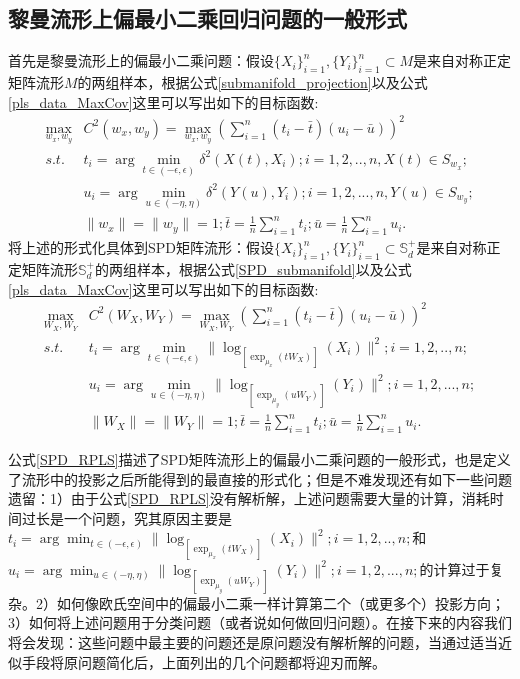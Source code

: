 \subsection{黎曼流形上偏最小二乘回归问题的一般形式}
\label{sec:RPLS_common}
首先是黎曼流形上的偏最小二乘问题：假设$\{X_i\}_{i=1}^{n},\{Y_i\}_{i=1}^{n} \subset M$是来自对称正定矩阵流形$M$的两组样本，根据公式\ref{submanifold_projection}以及公式\ref{pls_data_MaxCov}这里可以写出如下的目标函数:
\begin{equation}
\label{Riemannian_PLS}
\begin{split}
\max_{w_x,w_y}& C^2(w_x,w_y)=\max_{w_x,w_y}{\left(\sum_{i=1}^{n}(t_i-\bar{t})(u_i-\bar{u})\right)^2}\\
s.t.~~&t_i=\arg\min_{t \in (-\epsilon,\epsilon)}\delta^{2}(X(t),X_i);i=1,2,..,n, X(t) \in S_{w_x};\\
&u_i=\arg\min_{u \in (-\eta,\eta)}\delta^{2}(Y(u),Y_i);i=1,2,...,n, Y(u) \in S_{w_y};\\
&\|w_x\|=\|w_y\|=1;\bar{t}=\frac{1}{n}\sum_{i=1}^{n}t_i;\bar{u}=\frac{1}{n}\sum_{i=1}^{n}u_i.
\end{split}
\end{equation}
将上述的形式化具体到SPD矩阵流形：假设$\{X_i\}_{i=1}^{n},\{Y_i\}_{i=1}^{n} \subset \mathbb{S}_{d}^{+}$是来自对称正定矩阵流形$\mathbb{S}_{d}^{+}$的两组样本，根据公式\ref{SPD_submanifold}以及公式\ref{pls_data_MaxCov}这里可以写出如下的目标函数:
\begin{equation}
\label{SPD_RPLS}
\begin{split}
\max_{W_X,W_Y}& C^2(W_X,W_Y)=\max_{W_X,W_Y}{\left(\sum_{i=1}^{n}(t_i-\bar{t})(u_i-\bar{u})\right)^2}\\
s.t.~~&t_i=\arg\min_{t \in (-\epsilon,\epsilon)}\|\log_{[\exp_{\mu_x}(tW_X)]}(X_i)\|^2;i=1,2,..,n;\\
&u_i=\arg\min_{u \in (-\eta,\eta)}\|\log_{[\exp_{\mu_y}(uW_Y)]}(Y_i)\|^2;i=1,2,...,n;\\
&\|W_X\|=\|W_Y\|=1;\bar{t}=\frac{1}{n}\sum_{i=1}^{n}t_i;\bar{u}=\frac{1}{n}\sum_{i=1}^{n}u_i.
\end{split}
\end{equation}

公式\ref{SPD_RPLS}描述了SPD矩阵流形上的偏最小二乘问题的一般形式，也是定义了流形中的投影之后所能得到的最直接的形式化；但是不难发现还有如下一些问题遗留：1）由于公式\ref{SPD_RPLS}没有解析解，上述问题需要大量的计算，消耗时间过长是一个问题，究其原因主要是$t_i=\arg\min_{t \in (-\epsilon,\epsilon)}\|\log_{[\exp_{\mu_x}(tW_X)]}(X_i)\|^2;i=1,2,..,n;$和$u_i=\arg\min_{u \in (-\eta,\eta)}\|\log_{[\exp_{\mu_y}(uW_Y)]}(Y_i)\|^2;i=1,2,...,n;$的计算过于复杂。2）如何像欧氏空间中的偏最小二乘一样计算第二个（或更多个）投影方向；3）如何将上述问题用于分类问题（或者说如何做回归问题）。在接下来的内容我们将会发现：这些问题中最主要的问题还是原问题没有解析解的问题，当通过适当近似手段将原问题简化后，上面列出的几个问题都将迎刃而解。

